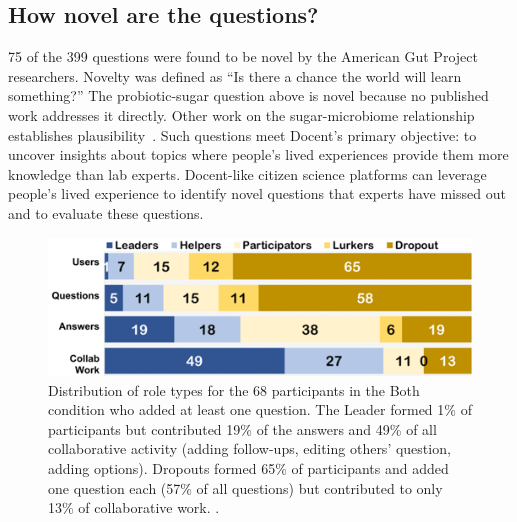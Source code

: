 \subsection{How novel are the questions?}
75 of the 399 questions were found to be novel by the American Gut Project researchers. Novelty was defined as “Is there a chance the world will learn something?” The probiotic-sugar question above is novel because no published work addresses it directly. Other work on the sugar-microbiome relationship establishes plausibility~\cite{Haukioja2008}. Such questions meet Docent’s primary objective: to uncover insights about topics where people’s lived experiences provide them more knowledge than lab experts. Docent-like citizen science platforms can leverage people’s lived experience to identify novel questions that experts have missed out and to evaluate these questions.

\begin{figure}[t] 
  \centering
  \includegraphics[width=1.0\textwidth]{figures/docent/fig-6.png}
  \caption[Distribution of role types]
{Distribution of role types for the 68 participants in the Both condition who added at least one question. The Leader formed 1\% of participants but contributed 19\% of the answers and 49\% of all collaborative activity (adding follow-ups, editing others’ question, adding options). Dropouts formed 65\% of participants and added one question each (57\% of all questions) but contributed to only 13\% of collaborative work. .}
  \label{fig:docent-6}
\end{figure}

